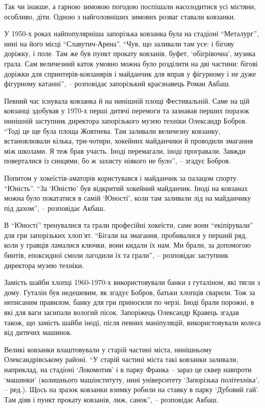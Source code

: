 Так чи інакше, а гарною зимовою погодою поспішали насолодитися усі містяни,
особливо, діти. Одною з найголовніших зимових розваг ставали ковзанки.

У 1950-х роках найпопулярніша запорізька ковзанка була на стадіоні \enquote{Металург},
нині на його місці \enquote{Славутич-Арена}. \enquote{Чув, що заливали там усе: і бігову
доріжку, і поле. Там же був пункт прокату ковзанів, буфет, \enquote{обігрівочна},
музика грала. Сам величезний каток умовно можна було розділити на дві частини:
бігові доріжки для спринтерів-ковзанярів і майданчик для вправ у фігурному і не
дуже фігурному катанні}, – розповідає запорізький краєзнавець Роман Акбаш.


Певний час існувала ковзанка й на нинішній площі Фестивальній. Саме на цій
ковзанці здобував у 1970-х перші дитячі перемоги та зазнавав перших поразок
нинішній заступник директора запорізького музею техніки Олександр Бобров. \enquote{Тоді
це ще була площа Жовтнева. Там заливали величезну ковзанку, встановлювали
кілька, три-чотири, хокейних майданчики й проводили змагання між школами. Я теж
брав участь. Іноді перемагали, іноді програвали. Завжди поверталися із синцями,
бо ж захисту ніякого не було}, – згадує Бобров.

Попитом у хокеїстів-аматорів користувався і майданчик за палацом спорту
\enquote{Юність}. \enquote{За \enquote{Юністю} був відкритий хокейний майданчик. Іноді на ковзанах
можна було покататися в самій \enquote{Юності}, коли там заливали лід на майданчику під
дахом}, – розповідає Акбаш.

В \enquote{Юності} тренувалися та грали професійні хокеїсти, саме вони \enquote{екіпірували}
для гри запорізьких хлоп’ят. \enquote{Бігали на змагання, пробивалися у перший ряд,
коли у гравців ламалися ключки, вони кидали їх нам. Ми брали, за допомогою
бинтів, епоксидної смоли лагодили їх та грали}, – розповідає заступник
директора музею техніки.


Замість шайби хлопці 1960-1970-х використовували банки з гуталіном, які тягли з
дому. Гуталін був недешевим, як згадує Бобров, батьки хлопців сварили. Тож за
неписаним правилом, банку для гри приносили по черзі. Іноді брали порожні, в
які для ваги засипали вологий пісок. Запоріжець Олександр Кравець згадав також,
що замість шайби іноді, після певних маніпуляцій, використовували колеса від
дитячих машинок.

Великі ковзанки влаштовували у старій частині міста, нинішньому
Олександрівському районі. \enquote{У старій частині міста такі ковзанки заливали,
наприклад, на стадіоні \enquote{Локомотив} і в парку Франка – зараз це сквер навпроти
\enquote{машинки} (колишнього машінституту, нині університету \enquote{Запорізька політехніка},
– ред.). Щось на зразок ковзанки взимку робили на ставку в парку \enquote{Дубовий гай}.
Там діяв і пункт прокату ковзанів, лиж, санок}, – розповідає Акбаш.


